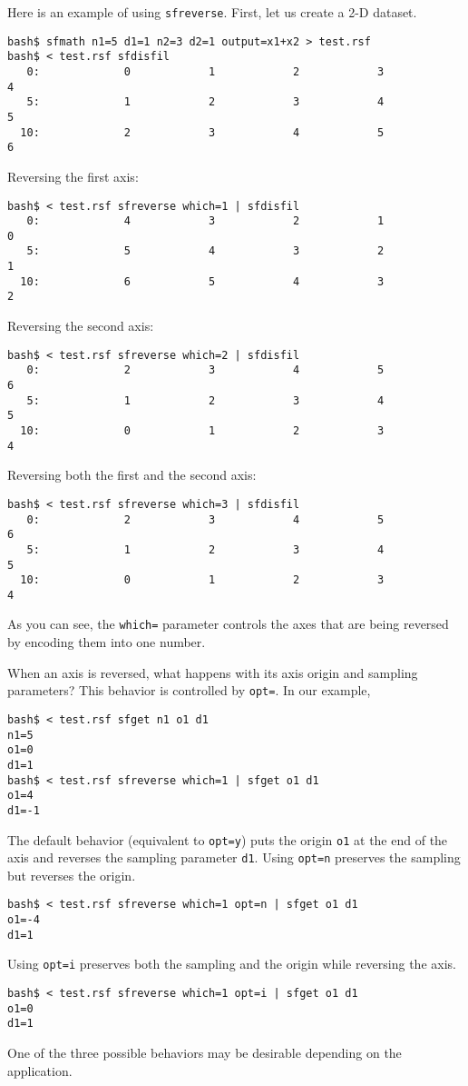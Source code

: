 Here is an example of using \texttt{sfreverse}. First, let us create a
2-D dataset.
\begin{verbatim}
bash$ sfmath n1=5 d1=1 n2=3 d2=1 output=x1+x2 > test.rsf
bash$ < test.rsf sfdisfil
   0:             0            1            2            3            4
   5:             1            2            3            4            5
  10:             2            3            4            5            6
\end{verbatim}
Reversing the first axis:
\begin{verbatim}
bash$ < test.rsf sfreverse which=1 | sfdisfil
   0:             4            3            2            1            0
   5:             5            4            3            2            1
  10:             6            5            4            3            2
\end{verbatim}
Reversing the second axis:
\begin{verbatim}
bash$ < test.rsf sfreverse which=2 | sfdisfil
   0:             2            3            4            5            6
   5:             1            2            3            4            5
  10:             0            1            2            3            4
\end{verbatim}
Reversing both the first and the second axis:
\begin{verbatim}
bash$ < test.rsf sfreverse which=3 | sfdisfil
   0:             2            3            4            5            6
   5:             1            2            3            4            5
  10:             0            1            2            3            4
\end{verbatim}
As you can see, the \texttt{which=} parameter controls the axes that are
being reversed by encoding them into one number.

When an axis is reversed, what happens with its axis origin and
sampling parameters? This behavior is controlled by \texttt{opt=}. In
our example,
\begin{verbatim}
bash$ < test.rsf sfget n1 o1 d1
n1=5
o1=0
d1=1
bash$ < test.rsf sfreverse which=1 | sfget o1 d1
o1=4
d1=-1
\end{verbatim}
The default behavior (equivalent to \texttt{opt=y}) puts the origin
\texttt{o1} at the end of the axis and reverses the sampling parameter
\texttt{d1}.  Using \texttt{opt=n} preserves the sampling but reverses
the origin.
\begin{verbatim}
bash$ < test.rsf sfreverse which=1 opt=n | sfget o1 d1
o1=-4
d1=1
\end{verbatim}
Using \texttt{opt=i} preserves both the sampling and the origin while
reversing the axis.
\begin{verbatim}
bash$ < test.rsf sfreverse which=1 opt=i | sfget o1 d1
o1=0
d1=1
\end{verbatim}
One of the three possible behaviors may be desirable depending on the
application.

